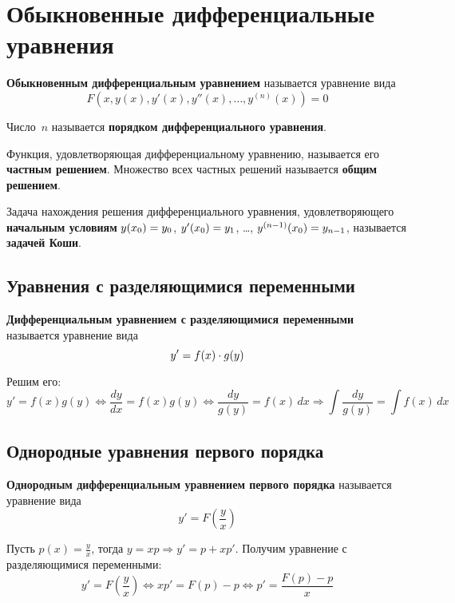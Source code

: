 \section{Обыкновенные дифференциальные уравнения}
 \textbf{Обыкновенным дифференциальным уравнением} называется уравнение вида
\begin{equation*}
F(x, y(x), y'(x), y''(x), \ldots, y^{(n)}(x)) = 0
\end{equation*}

Число~$n$ называется \textbf{порядком дифференциального уравнения}.

Функция, удовлетворяющая дифференциальному уравнению, называется его \textbf{частным решением}.
Множество всех частных решений называется \textbf{общим решением}.

Задача нахождения решения дифференциального уравнения, удовлетворяющего \textbf{начальным условиям} $y(x_0) \opbr= y_0$, $y'(x_0) \opbr= y_1$, \ldots, $y^{(n-1)}(x_0) \opbr= y_{n-1}$, называется \textbf{задачей Коши}.

\subsection{Уравнения с разделяющимися переменными}
 \textbf{Дифференциальным уравнением с разделяющимися переменными} называется уравнение вида
\begin{equation*}
y' \opbr= f(x) \cdot g(y)
\end{equation*}

Решим его:
\begin{equation*}
y' = f(x)g(y) \Leftrightarrow
\frac{dy}{dx} = f(x)g(y) \Leftrightarrow
\frac{dy}{g(y)} = f(x)\,dx \Rightarrow
\int \frac{dy}{g(y)} = \int f(x)\,dx
\end{equation*}

\subsection{Однородные уравнения первого порядка}
 \textbf{Однородным дифференциальным уравнением первого порядка} называется уравнение вида
\begin{equation*}
y' = F \left( \frac{y}x \right)
\end{equation*}

Пусть $p(x) = \frac{y}x$, тогда $y = xp \Rightarrow y' = p + xp'$.
Получим уравнение с разделяющимися переменными:
\begin{equation*}
y' = F \left( \frac{y}x \right) \Leftrightarrow
x p' = F(p) - p \Leftrightarrow
p' = \frac{F(p) - p}x
\end{equation*}

